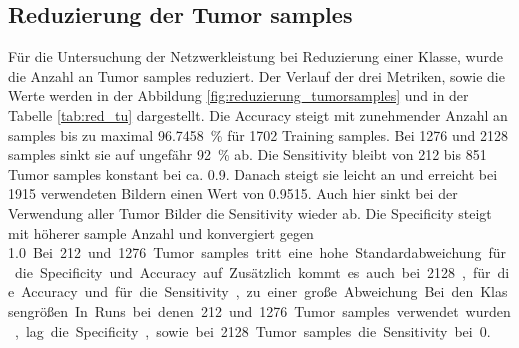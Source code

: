 \subsection{Reduzierung der Tumor samples}
Für die Untersuchung der Netzwerkleistung bei Reduzierung einer Klasse, wurde die Anzahl an Tumor samples reduziert.
Der Verlauf der drei Metriken, sowie die Werte werden in der Abbildung \ref{fig:reduzierung_tumorsamples} und in der Tabelle \ref{tab:red_tu} dargestellt.
Die Accuracy steigt mit zunehmender Anzahl an samples bis zu maximal \SI{96.7458}{\percent} für 1702 Training samples.
Bei 1276 und 2128 samples sinkt sie auf ungefähr \SI{92}{\percent} ab. 
Die Sensitivity bleibt von 212 bis 851 Tumor samples konstant bei ca. \SI{0.9}{}.
Danach steigt sie leicht an und erreicht bei 1915 verwendeten Bildern einen Wert von \SI{0.9515}{}.
Auch hier sinkt bei der Verwendung aller Tumor Bilder die Sensitivity wieder ab.
Die Specificity steigt mit höherer sample Anzahl und konvergiert gegen \SI{1.0}.
Bei 212 und 1276 Tumor samples tritt eine hohe Standardabweichung für die Specificity und Accuracy auf.
Zusätzlich kommt es auch bei 2128, für die Accuracy und für die Sensitivity, zu einer große Abweichung
Bei den Klassengrößen 
In Runs bei denen 212 und 1276 Tumor samples verwendet wurden, lag die Specificity, 
sowie bei 2128 Tumor samples die Sensitivity bei 0.
